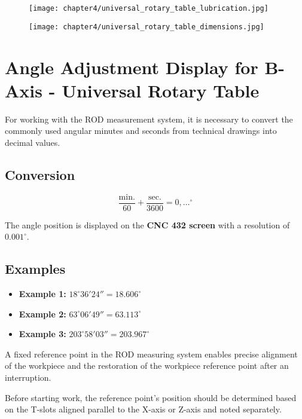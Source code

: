 \begin{figure}[h]
    \centering
    \texttt{[image: chapter4/universal\_rotary\_table\_lubrication.jpg]}
\end{figure}


\begin{figure}[h]
    \centering
    \texttt{[image: chapter4/universal\_rotary\_table\_dimensions.jpg]}
\end{figure}

\section{Angle Adjustment Display for B-Axis - Universal Rotary Table}

For working with the ROD measurement system, it is necessary to convert the commonly used angular minutes and seconds from technical drawings into decimal values.

\subsection*{Conversion}
\[
\frac{\text{min.}}{60} + \frac{\text{sec.}}{3600} = 0,\dots^{\circ}
\]

The angle position is displayed on the \textbf{CNC 432 screen} with a resolution of $0.001^{\circ}$.

\subsection*{Examples}
\begin{itemize}
    \item \textbf{Example 1:} $18^{\circ} 36' 24'' = 18.606^{\circ}$
    \item \textbf{Example 2:} $63^{\circ} 06' 49'' = 63.113^{\circ}$
    \item \textbf{Example 3:} $203^{\circ} 58' 03'' = 203.967^{\circ}$
\end{itemize}

A fixed reference point in the ROD measuring system enables precise alignment of the workpiece and the restoration of the workpiece reference point after an interruption.

Before starting work, the reference point’s position should be determined based on the T-slots aligned parallel to the X-axis or Z-axis and noted separately.\footnotemark

